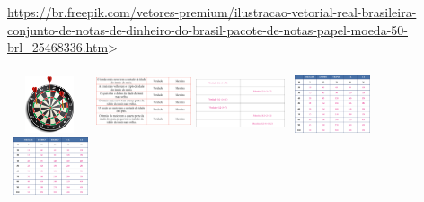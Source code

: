 \begin{escolha}
\begin{escolha}




\url{https://br.freepik.com/vetores-premium/ilustracao-vetorial-real-brasileira-conjunto-de-notas-de-dinheiro-do-brasil-pacote-de-notas-papel-moeda-50-brl_25468336.htm}\textgreater{}

\begin{escolha}
\item \includegraphics[width=0.98131in,height=0.65625in]{media/image108.png}
\includegraphics[width=1.10972in,height=0.74212in]{media/image109.png}
\includegraphics[width=1.02736in,height=0.68704in]{media/image110.png}
\includegraphics[width=1.01042in,height=0.67572in]{media/image111.png}
\includegraphics[width=1.01042in,height=0.67572in]{media/image111.png}


\end{escolha}
\end{escolha}
\end{escolha}
